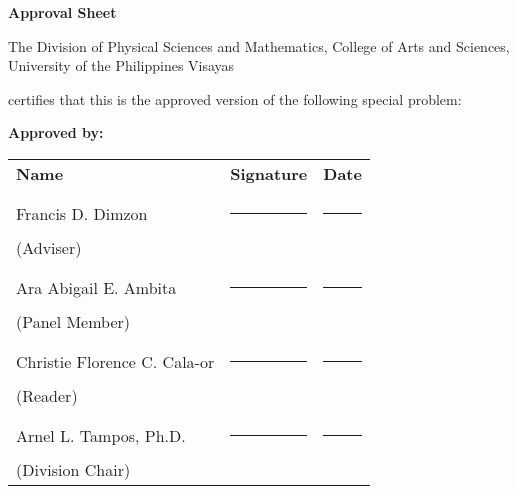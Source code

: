 \thispagestyle{empty}
\begin{center}
	\textbf{Approval Sheet}
	
	The Division of Physical Sciences and Mathematics, College of Arts and Sciences, University of the Philippines Visayas 
	
	certifies that this is the approved version of the following special problem:
	
\end{center}

{\small\textbf{Approved by:}}

\newcommand{\signaturerule}{\rule{10em}{.4pt}}
\begin{tabular}{lll}
	\bfseries Name  & \bfseries Signature & \bfseries Date\\ \\
	Francis D. Dimzon &\signaturerule  & \signaturerule\\ 
	(Adviser)\\\\
	Ara Abigail E. Ambita &\signaturerule  & \signaturerule\\ 
	(Panel Member)\\\\
	
	Christie Florence C. Cala-or &\signaturerule  & \signaturerule\\ 
	(Reader)\\\\
	
	Arnel L. Tampos, Ph.D. &\signaturerule &\signaturerule\\
	(Division Chair)
	
\end{tabular}